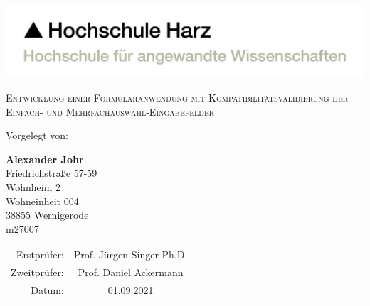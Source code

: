 \begin{titlepage}

    \includegraphics[width=0.5\paperwidth]{Sonstiges/Deckblatt/HSH-Logo-RGB-dt.pdf}

    \begin{center}



        \vfill


        \LARGE{\textsc{Entwicklung einer Formularanwendung mit Kompatibilitätsvalidierung der Einfach- und Mehrfachauswahl-Eingabefelder}}

        \vfill
        \vfill
        \vfill



        \normalsize
        Vorgelegt von:

        \vspace{3mm}

        \textbf{Alexander Johr}\\
        Friedrichstraße 57-59\\
        Wohnheim 2\\
        Wohneinheit 004\\
        38855 Wernigerode\\
        m27007

        \vspace{21mm}

        \begin{tabular}{r c}
            Erstprüfer:  & Prof. Jürgen Singer Ph.D. \\
            Zweitprüfer: & Prof. Daniel Ackermann    \\
            Datum:       & 01.09.2021                \\
        \end{tabular}

        \vspace{5mm}

    \end{center}

\end{titlepage}